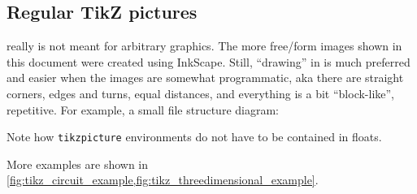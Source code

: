 \subsection{Regular TikZ pictures}

 really is not meant for arbitrary graphics.
The more free\-/form images shown in this document were created using InkScape.
Still, \enquote{drawing} in  is much preferred and easier when the
images are somewhat programmatic, aka there are straight corners, edges and turns,
equal distances, and everything is a bit \enquote{block-like}, repetitive.
For example, a small file structure diagram:
\begin{center}
\end{center}
Note how \verb|tikzpicture| environments do not have to be contained in floats.

More  examples are shown in
\cref{fig:tikz_circuit_example,fig:tikz_threedimensional_example}.

